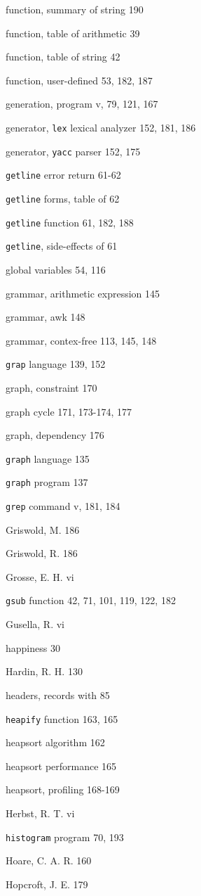 \begin{multicols}{3}
function, summary of string 190

function, table of arithmetic 39

function, table of string 42

function, user-defined 53, 182, 187

generation, program v, 79, 121, 167

generator, \verb'lex' lexical analyzer 152, 181, 186

generator, \verb'yacc' parser 152, 175

\verb'getline' error return 61-62

\verb'getline' forms, table of 62

\verb'getline' function 61, 182, 188

\verb'getline', side-effects of 61

global variables 54, 116

grammar, arithmetic expression 145

grammar, awk 148

grammar, contex-free 113, 145, 148

\verb'grap' language 139, 152

graph, constraint 170

graph cycle 171, 173-174, 177

graph, dependency 176

\verb'graph' language 135

\verb'graph' program 137

\verb'grep' command v, 181, 184

Griswold, M. 186

Griswold, R. 186

Grosse, E. H. vi

\verb'gsub' function 42, 71, 101, 119, 122, 182

Gusella, R. vi

happiness 30

Hardin, R. H. 130

headers, records with 85

\verb'heapify' function 163, 165

heapsort algorithm 162

heapsort performance 165

heapsort, profiling 168-169

Herbst, R. T. vi

\verb'histogram' program 70, 193

Hoare, C. A. R. 160

Hopcroft, J. E. 179


\end{multicols}
